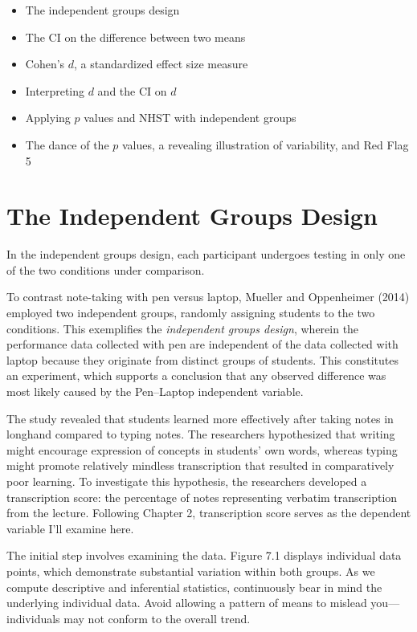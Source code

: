 \documentclass[
  letterpaper,
  DIV=11,
  numbers=noendperiod]{scrreprt}
\providecommand{\tightlist}{%
  \setlength{\itemsep}{0pt}\setlength{\parskip}{0pt}}
\begin{document}
\begin{itemize}
\tightlist
\item
  The independent groups design
\item
  The CI on the difference between two means
\item
  Cohen's \(d\), a standardized effect size measure
\item
  Interpreting \(d\) and the CI on \(d\)
\item
  Applying \(p\) values and NHST with independent groups
\item
  The dance of the \(p\) values, a revealing illustration of
  variability, and Red Flag 5
\end{itemize}

\section{The Independent Groups
Design}\label{the-independent-groups-design-1}

In the independent groups design, each participant undergoes testing in
only one of the two conditions under comparison.

To contrast note-taking with pen versus laptop, Mueller and Oppenheimer
(2014) employed two independent groups, randomly assigning students to
the two conditions. This exemplifies the \emph{independent groups
design}, wherein the performance data collected with pen are independent
of the data collected with laptop because they originate from distinct
groups of students. This constitutes an experiment, which supports a
conclusion that any observed difference was most likely caused by the
Pen--Laptop independent variable.

The study revealed that students learned more effectively after taking
notes in longhand compared to typing notes. The researchers hypothesized
that writing might encourage expression of concepts in students' own
words, whereas typing might promote relatively mindless transcription
that resulted in comparatively poor learning. To investigate this
hypothesis, the researchers developed a transcription score: the
percentage of notes representing verbatim transcription from the
lecture. Following Chapter 2, transcription score serves as the
dependent variable I'll examine here.

The initial step involves examining the data. Figure 7.1 displays
individual data points, which demonstrate substantial variation within
both groups. As we compute descriptive and inferential statistics,
continuously bear in mind the underlying individual data. Avoid allowing
a pattern of means to mislead you---individuals may not conform to the
overall trend.
\end{document}
